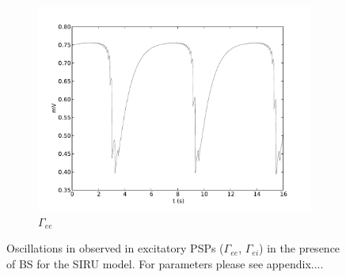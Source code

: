 \documentclass[a4paper,12pt]{article}
\begin{document}
\begin{figure}
\begin{subfigure}[b]{0.5\textwidth}
		\includegraphics[scale=0.35]{frontiers-2012-images-revised/biphasic-gamma_yml-00460_ode-burst-psp-res_yml-mod-res-0_9-2-1-1_yml-T_ei-intra.pdf}
		\caption{$\Gamma_{ee}$}
	\end{subfigure}
      \label{fig:emerging_slow_zeta}
	\caption{Oscillations in  observed in excitatory PSPs ($\Gamma_{ee}$, $\Gamma_{ei}$) in the presence of BS for the SIRU model. 
	For parameters please see appendix....}
\end{figure}
\end{document}
